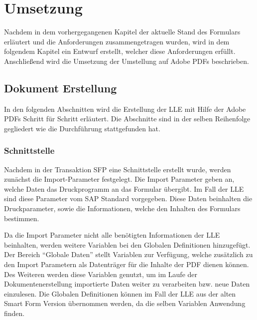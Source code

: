 \chapter{Umsetzung}

 Nachdem in dem vorhergegangenen Kapitel der aktuelle Stand des Formulars erläutert und die Anforderungen zusammengetragen wurden, wird in dem folgendem Kapitel ein Entwurf erstellt, welcher diese Anforderungen erfüllt. Anschließend wird die Umsetzung der Umstellung auf Adobe \ac{PDF}s beschrieben.


 
\section{Dokument Erstellung}

In den folgenden Abschnitten wird die Erstellung der \ac{LLE} mit Hilfe der Adobe \ac{PDF}s Schritt für Schritt erläutert. Die Abschnitte sind in der selben Reihenfolge gegliedert wie die Durchführung stattgefunden hat.
\subsection{Schnittstelle}

Nachdem in der Transaktion SFP eine Schnittstelle erstellt wurde, werden zunächst die Import-Parameter festgelegt. Die Import Parameter geben an, welche Daten das Druckprogramm an das Formular übergibt. Im Fall der \ac{LLE} sind diese Parameter vom SAP Standard vorgegeben.
Diese Daten beinhalten die Druckparameter, sowie die Informationen, welche den Inhalten des Formulars bestimmen. 

Da die Import Parameter nicht alle benötigten Informationen der \ac{LLE} beinhalten, werden weitere Variablen bei den Globalen Definitionen hinzugefügt. Der Bereich "`Globale Daten"' stellt Variablen zur Verfügung, welche zusätzlich zu den Import Parametern als Datenträger für die Inhalte der \ac{PDF} dienen können. Des Weiteren werden diese Variablen genutzt, um im Laufe der Dokumentenerstellung importierte Daten weiter zu verarbeiten bzw. neue Daten einzulesen.
Die Globalen Definitionen können im Fall der \ac{LLE} aus der alten Smart Form Version übernommen werden, da die selben Variablen Anwendung finden. 

